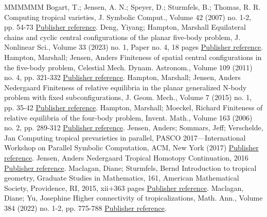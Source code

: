 \documentclass[11pt]{article}
\theoremstyle{definition}
\numberwithin{equation}{section}
\begin{document}
\begin{thebibliography}{MMMMMM}
 Bogart, T.; Jensen, A. N.; Speyer, D.; Sturmfels, B.; Thomas, R. R. Computing tropical varieties, J. Symbolic Comput., Volume 42 (2007) no. 1-2, pp. 54-73 \href{https://alco.centre-mersenne.org/articles/10.5802/alco.327/#BJST07}{Publisher reference}.
 Deng, Yiyang; Hampton, Marshall Equilateral chains and cyclic central configurations of the planar five-body problem, J. Nonlinear Sci., Volume 33 (2023) no. 1, Paper no. 4, 18 pages \href{https://alco.centre-mersenne.org/articles/10.5802/alco.327/#DengHampton23}{Publisher reference}.
 Hampton, Marshall; Jensen, Anders Finiteness of spatial central configurations in the five-body problem, Celestial Mech. Dynam. Astronom., Volume 109 (2011) no. 4, pp. 321-332 \href{https://alco.centre-mersenne.org/articles/10.5802/alco.327/#HamptonJensen11}{Publisher reference}.
 Hampton, Marshall; Jensen, Anders Nedergaard Finiteness of relative equilibria in the planar generalized N-body problem with fixed subconfigurations, J. Geom. Mech., Volume 7 (2015) no. 1, pp. 35-42 \href{https://alco.centre-mersenne.org/articles/10.5802/alco.327/#HamptonJensen15}{Publisher reference}.
 Hampton, Marshall; Moeckel, Richard Finiteness of relative equilibria of the four-body problem, Invent. Math., Volume 163 (2006) no. 2, pp. 289-312 \href{https://alco.centre-mersenne.org/articles/10.5802/alco.327/#HamptonMoeckel06}{Publisher reference}.
 Jensen, Anders; Sommars, Jeff; Verschelde, Jan Computing tropical prevarieties in parallel, PASCO 2017—International Workshop on Parallel Symbolic Computation, ACM, New York (2017) \href{https://alco.centre-mersenne.org/articles/10.5802/alco.327/#JSV17}{Publisher reference}.
 Jensen, Anders Nedergaard Tropical Homotopy Continuation, 2016 \href{https://alco.centre-mersenne.org/articles/10.5802/alco.327/#Jensen16}{Publisher reference}.
 Maclagan, Diane; Sturmfels, Bernd Introduction to tropical geometry, Graduate Studies in Mathematics, 161, American Mathematical Society, Providence, RI, 2015, xii+363 pages \href{https://alco.centre-mersenne.org/articles/10.5802/alco.327/#MaclaganSturmfels15}{Publisher reference}.
 Maclagan, Diane; Yu, Josephine Higher connectivity of tropicalizations, Math. Ann., Volume 384 (2022) no. 1-2, pp. 775-788 \href{https://alco.centre-mersenne.org/articles/10.5802/alco.327/#MaclaganYu21}{Publisher reference}.

\end{thebibliography}
\end{document}
